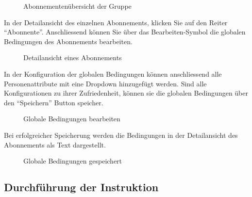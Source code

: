 \begin{figure}[h]
   \centering
   \caption{Abonnementenübersicht der Gruppe}
\end{figure}

In der Detailansicht des einzelnen Abonnements, klicken Sie auf den Reiter ``Abonnente''. Anschliessend können Sie über das 
Bearbeiten-Symbol die globalen Bedingungen des Abonnements bearbeiten.

\begin{figure}[h]
   \centering
   \caption{Detailansicht eines Abonnements}
\end{figure}

In der Konfiguration der globalen Bedingungen können anschliessend alle Personenattribute mit eine Dropdown 
hinzugefügt werden. Sind alle Konfigurationen zu ihrer Zufriedenheit, können sie die globalen Bedingungen über den ``Speichern''
Button speicher.

\begin{figure}[h]
   \centering
   \caption{Globale Bedingungen bearbeiten}
\end{figure}

Bei erfolgreicher Speicherung werden die Bedingungen in der Detailansicht des Abonnements als
Text dargestellt.

\begin{figure}[h]
   \centering
   \caption{Globale Bedingungen gespeichert}
\end{figure}

\newpage

\subsection{Durchführung der Instruktion}

